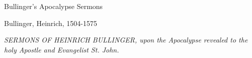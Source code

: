 \thispagestyle{empty}
\null
\vfill
\begin{center}
{\fontsize{22}{28}\selectfont Bullinger's Apocalypse Sermons\par}
\vspace{1.5\baselineskip}
{\large Bullinger, Heinrich, 1504-1575\par}
\vspace{2\baselineskip}
{\small\itshape SERMONS OF HEINRICH BULLINGER, upon the Apocalypse revealed to the holy Apostle and Evangelist St. John.\par}
\end{center}
\vfill
\null
